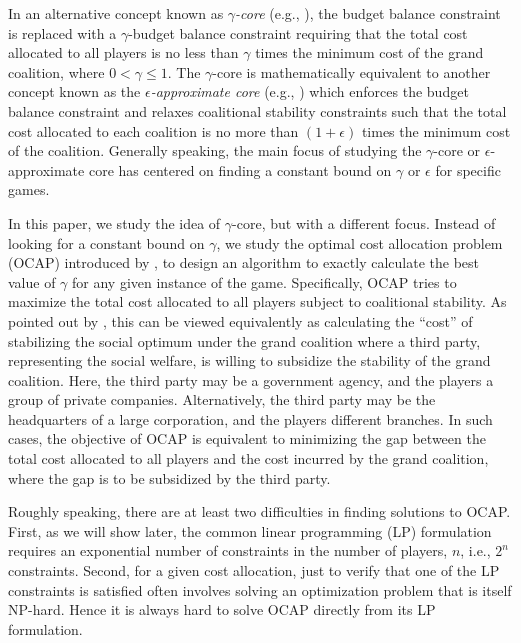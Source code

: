 \documentclass[ijoc,nonblindrev]{informs3} %
\begin{document}
In an alternative concept known as {\em $\gamma$-core} (e.g., \citealt{Jain2007CostSharing}), the budget balance constraint is replaced with a $\gamma$-budget balance constraint requiring that the total cost allocated to all players is no less than ${\gamma}$ times the minimum cost of the grand coalition, where $0<\gamma\leq 1$. The  $\gamma$-core is mathematically equivalent to another concept known as the {\em $\epsilon$-approximate core} (e.g., \citealt{Faigle1998EuclideanTSPGamesCore,Blaser2008MetricTSPGamesCore}) which enforces the budget balance constraint and relaxes coalitional stability constraints such that the total cost allocated to each coalition is no more than $(1+\epsilon)$ times the minimum cost of the coalition.  Generally speaking, the main focus of studying the $\gamma$-core or $\epsilon$-approximate core has centered on finding a constant bound on $\gamma$ or $\epsilon$ for specific games.

In this paper, we study the idea of $\gamma$-core, but with a different focus. Instead of looking for a constant bound on $\gamma$, we study the optimal cost allocation problem (OCAP) introduced by \cite{Caprara2010LPB}, to design an algorithm to exactly calculate the best value of $\gamma$ for any given instance of the game.
Specifically, OCAP tries to maximize the total cost allocated to all players subject to coalitional stability.
As pointed out by \cite{Caprara2010LPB}, this can be viewed equivalently as calculating the ``cost'' of stabilizing the social optimum under the grand coalition where a third party, representing the social welfare, is willing to subsidize the stability of the grand coalition.
Here, the third party may be a government agency, and the players a group of private companies. Alternatively, the third party may be the headquarters of a large corporation, and the players different branches. In such cases, the objective of OCAP is equivalent to minimizing the gap between the total cost allocated to all players and the cost incurred by the grand coalition, where the gap is to be subsidized by the third party.

Roughly speaking, there are at least two difficulties in finding solutions to OCAP. First, as we will show later, the common linear programming (LP) formulation requires an exponential number of constraints in the number of players, $n$, i.e., $2^n$ constraints.  Second, for a given cost allocation, just to verify that one of the LP constraints is satisfied often involves solving an optimization problem that is itself NP-hard. Hence it is always hard to solve OCAP directly from its LP formulation.
\end{document}
